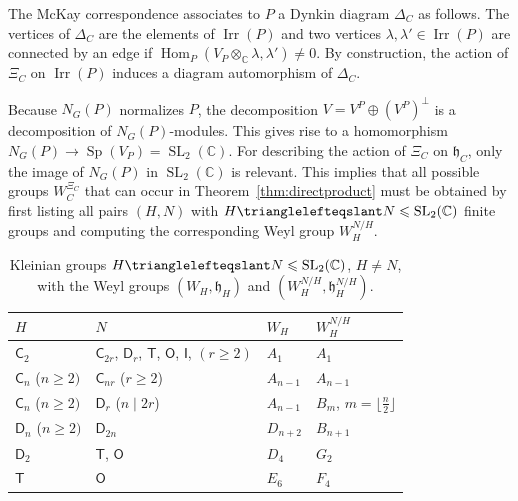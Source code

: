 \documentclass[a4paper]{amsart}
\theoremstyle{plain}
\theoremstyle{definition}
\theoremstyle{remark}
\DeclareMathOperator{\Hom}{Hom}
\DeclareMathOperator{\Irr}{Irr}
\DeclareMathOperator{\SL}{SL}
\DeclareMathOperator{\Sp}{Sp}
\newcommand{\CC}{\mathbb C}
\begin{document}
The McKay correspondence associates to \(P\) a Dynkin diagram \(\Delta_C\) as follows.
The vertices of \(\Delta_C\) are the elements of \(\Irr(P)\) and two vertices \(\lambda,\lambda'\in \Irr(P)\) are connected by an edge if \(\Hom_P(V_P\otimes_\CC \lambda, \lambda') \neq 0\).
By construction, the action of \(\Xi_C\) on \(\Irr(P)\) induces a diagram automorphism of \(\Delta_C\).

Because \(N_G(P)\) normalizes \(P\), the decomposition \(V = V^P \oplus (V^P)^\perp\) is a decomposition of \(N_G(P)\)-modules. This gives rise to a homomorphism $N_G(P) \to \Sp(V_P) = \SL_2(\CC)$.
For describing the action of \(\Xi_C\) on \(\mathfrak h_C\), only the image of \(N_G(P)\) in \(\SL_2(\CC)\) is relevant. This implies that all possible groups \(W_C^{\Xi_C}\) that can occur in Theorem~\ref{thm:directproduct} must be obtained by first listing all pairs \((H, N)\) with \(H \trianglelefteqslant N \leqslant \SL_2(\CC)\) finite groups and computing the corresponding Weyl group \(W_{H}^{N/H}\).

\begin{table}[h]
  \caption{Kleinian groups \(H\trianglelefteqslant N\leqslant\SL_2(\CC)\), \(H\neq N\), with the Weyl groups \((W_H, \mathfrak h_H)\) and \((W_H^{N/H}, \mathfrak h_H^{N/H})\).}
  \label{tab:kleinianpairs}
  \begin{tabular}{l|l|l|l}
  \(H\)                         & \(N\)       & \(W_H\) & \(W_H^{N/H}\)             \\
  \hline
  \(\mathsf C_2\)               & \(\mathsf C_{2r}\), \(\mathsf D_r\), \(\mathsf T\), \(\mathsf O\), \(\mathsf I\), \((r\geqslant 2)\) & \(A_1\)         & \(A_1\)                                     \\
  \(\mathsf C_n\) (\(n\geqslant 2)\) & \(\mathsf C_{nr}\) (\(r\geqslant 2\))                                                                & \(A_{n - 1}\)   & \(A_{n - 1}\)                               \\
  \(\mathsf C_n\) (\(n\geqslant 2)\) & \(\mathsf D_{r}\) (\(n \mid 2r\))                                                                & \(A_{n - 1}\)   & \(B_m\), \(m = \lfloor \frac{n}{2}\rfloor\) \\
  \(\mathsf D_n\) (\(n\geqslant 2)\) & \(\mathsf D_{2n}\)                                                                              & \(D_{n + 2}\)   & \(B_{n + 1}\)                               \\
  \(\mathsf D_2\)               & \(\mathsf T\), \(\mathsf O\)                                                                    & \(D_4\)         & \(G_2\)                                     \\
  \(\mathsf T\)                 & \(\mathsf O\)                                                                                   & \(E_6\)         & \(F_4\)
  \end{tabular}
\end{table}
\end{document}

